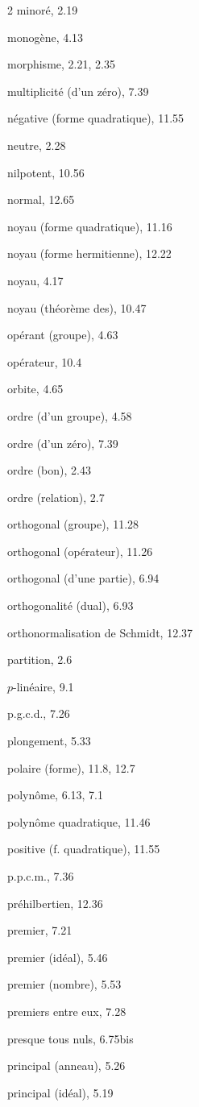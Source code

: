 \begin{multicols}{2}
minoré, 2.19

monogène, 4.13

morphisme, 2.21, 2.35

multiplicité (d'un zéro), 7.39

\medskip
négative (forme quadratique), 11.55

neutre, 2.28

nilpotent, 10.56

normal, 12.65

noyau (forme quadratique), 11.16

noyau (forme hermitienne), 12.22

noyau, 4.17

noyau (théorème des), 10.47

\medskip
opérant (groupe), 4.63

opérateur, 10.4

orbite, 4.65

ordre (d'un groupe), 4.58

ordre (d'un zéro), 7.39

ordre (bon), 2.43

ordre (relation), 2.7

orthogonal (groupe), 11.28

orthogonal (opérateur), 11.26

orthogonal (d'une partie), 6.94

orthogonalité (dual), 6.93

orthonormalisation de Schmidt, 12.37

\medskip
partition, 2.6

$p$-linéaire, 9.1

p.g.c.d., 7.26

plongement, 5.33

polaire (forme), 11.8, 12.7

polynôme, 6.13, 7.1

polynôme quadratique, 11.46

positive (f. quadratique), 11.55

p.p.c.m., 7.36

préhilbertien, 12.36

premier, 7.21

premier (idéal), 5.46

premier (nombre), 5.53

premiers entre eux, 7.28

presque tous nuls, 6.75bis

principal (anneau), 5.26

principal (idéal), 5.19


\end{multicols}
